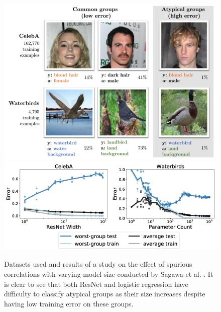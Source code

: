 \documentclass{article}
\begin{document}
\begin{figure}
    \centering
    \includegraphics[scale=0.2]{sagawa_dataset.png}
    \includegraphics[scale=0.28]{sagawa_diagram_standard.png}
    \caption{Datasets used and results of a study on the effect of spurious correlations with varying model size conducted by Sagawa et al. \cite{pmlr-v119-sagawa20a}. It is clear to see that both ResNet and logistic regression have difficulty to classify atypical groups as their size increases despite having low training error on these groups.}
    \label{fig:sagawaImg}
\end{figure}
\end{document}
